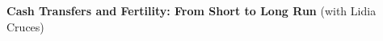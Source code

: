 \documentclass[margin]{res} %
\begin{document}
\begin{resume}

{\bf Cash Transfers and Fertility: From Short to Long Run} (with Lidia Cruces)




\end{resume}
\end{document}
